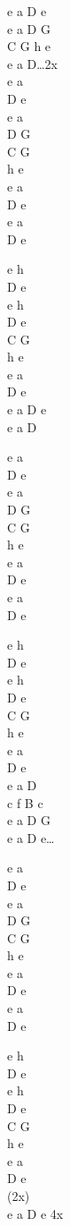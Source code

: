 \begin{chord}
e a D e\\
e a D G\\
C G h e\\
e a D…2x\\
e a\\
D e\\
e a\\
D G\\
C G\\
h e\\
e a\\
D e\\
e a\\
D e

e h\\
D e\\
e h\\
D e\\
C G\\
h e\\
e a\\
D e\\
e a D e\\
e a D

e a\\
D e\\
e a\\
D G\\
C G\\
h e\\
e a\\
D e\\
e a\\
D e

e h\\
D e\\
e h\\
D e\\
C G\\
h e\\
e a\\
D e\\
e a D\\
c f B c\\
e a D G \\
e a D e…

e a\\
D e\\
e a\\
D G\\
C G\\
h e\\
e a\\
D e\\
e a\\
D e

e h\\
D e\\
e h\\
D e\\
C G\\
h e\\
e a\\
D e\\
(2x)\\
e a D e 4x
\end{chord}

